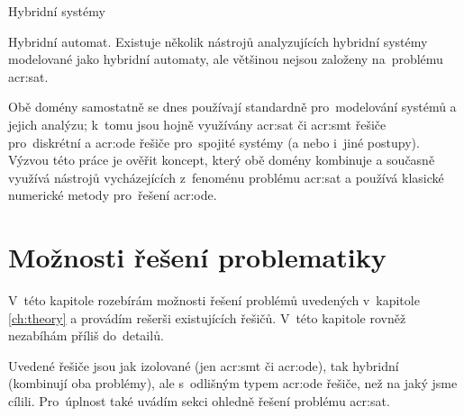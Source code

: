 \documentclass[thesis=M,czech]{FITthesis}[2012/06/26]
\newcommand{\acrlabel}[1]{acr:#1}
\newcommand{\acr}[1]{\acrshort{\acrlabel{#1}}}
\newcommand{\rf}[1]{\ref{#1}}
\begin{document}
\begin{section}{Hybridní systémy}
\begin{paragraph}{Hybridní automat.}
Existuje několik nástrojů
analyzujících hybridní systémy
modelované jako hybridní automaty,
ale většinou nejsou založeny
na~problému \acr{sat}.
\end{paragraph} %


\bigskip

Obě domény samostatně se dnes
používají standardně pro~modelování systémů
a jejich analýzu;
k~tomu jsou hojně využívány
\acr{sat} či \acr{smt} řešiče pro~diskrétní
a \acr{ode} řešiče pro~spojité systémy
(a nebo i~jiné postupy).
Výzvou této práce je ověřit koncept,
který obě domény kombinuje
a současně využívá nástrojů
vycházejících z~fenoménu problému \acr{sat}
a používá klasické numerické metody pro~řešení \acr{ode}.
\end{section} %



\chapter{Možnosti řešení problematiky}\label{ch:search}
V~této kapitole rozebírám možnosti řešení problémů
uvedených v~kapitole \rf{ch:theory}
a provádím rešerši existujících řešičů.
V~této kapitole rovněž nezabíhám příliš do~detailů.

Uvedené řešiče jsou jak izolované (jen \acr{smt} či \acr{ode}),
tak hybridní (kombinují oba problémy),
ale s~odlišným typem \acr{ode} řešiče, než na jaký jsme cílili.
Pro~úplnost také uvádím sekci ohledně řešení problému \acr{sat}.

\end{document}
